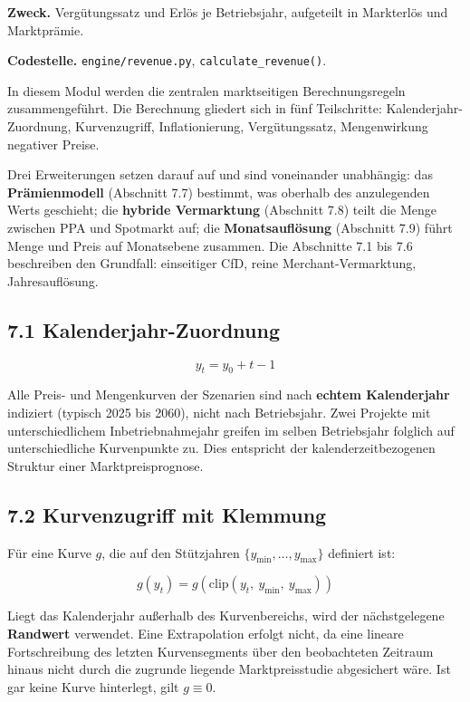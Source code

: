 \documentclass[
  a4paper,
  10pt]{article}
\begin{document}
\textbf{Zweck.} Vergütungssatz und Erlös je Betriebsjahr, aufgeteilt in
Markterlös und Marktprämie.

\textbf{Codestelle.} \nolinkurl{engine/revenue.py},
\texttt{calculate\_revenue()}.

In diesem Modul werden die zentralen marktseitigen Berechnungsregeln
zusammengeführt. Die Berechnung gliedert sich in fünf Teilschritte:
Kalenderjahr-Zuordnung, Kurvenzugriff, Inflationierung, Vergütungssatz,
Mengenwirkung negativer Preise.

Drei Erweiterungen setzen darauf auf und sind voneinander unabhängig:
das \textbf{Prämienmodell} (Abschnitt 7.7) bestimmt, was oberhalb des
anzulegenden Werts geschieht; die \textbf{hybride Vermarktung}
(Abschnitt 7.8) teilt die Menge zwischen PPA und Spotmarkt auf; die
\textbf{Monatsauflösung} (Abschnitt 7.9) führt Menge und Preis auf
Monatsebene zusammen. Die Abschnitte 7.1 bis 7.6 beschreiben den
Grundfall: einseitiger CfD, reine Merchant-Vermarktung, Jahresauflösung.

\hypertarget{kalenderjahr-zuordnung}{%
\subsection{7.1 Kalenderjahr-Zuordnung}\label{kalenderjahr-zuordnung}}

\[ y_t = y_0 + t - 1 \]

Alle Preis- und Mengenkurven der Szenarien sind nach \textbf{echtem
Kalenderjahr} indiziert (typisch 2025 bis 2060), nicht nach
Betriebsjahr. Zwei Projekte mit unterschiedlichem Inbetriebnahmejahr
greifen im selben Betriebsjahr folglich auf unterschiedliche
Kurvenpunkte zu. Dies entspricht der kalenderzeitbezogenen Struktur
einer Marktpreisprognose.

\hypertarget{kurvenzugriff-mit-klemmung}{%
\subsection{7.2 Kurvenzugriff mit
Klemmung}\label{kurvenzugriff-mit-klemmung}}

Für eine Kurve \(g\), die auf den Stützjahren
\(\{y_{\min}, \dots, y_{\max}\}\) definiert ist:

\[ g(y_t) = g\left(\mathrm{clip}(y_t,\ y_{\min},\ y_{\max})\right) \]

Liegt das Kalenderjahr außerhalb des Kurvenbereichs, wird der
nächstgelegene \textbf{Randwert} verwendet. Eine Extrapolation erfolgt
nicht, da eine lineare Fortschreibung des letzten Kurvensegments über
den beobachteten Zeitraum hinaus nicht durch die zugrunde liegende
Marktpreisstudie abgesichert wäre. Ist gar keine Kurve hinterlegt, gilt
\(g \equiv 0\).
\end{document}
